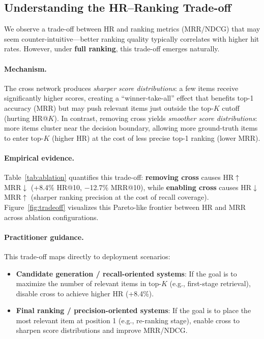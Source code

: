 \documentclass[sigconf,natbib=true]{acmart}
\begin{document}
\subsection{Understanding the HR--Ranking Trade-off}

We observe a trade-off between HR and ranking metrics (MRR/NDCG) that
may seem counter-intuitive---better ranking quality typically correlates
with higher hit rates. However, under \textbf{full ranking}, this
trade-off emerges naturally.

\paragraph{Mechanism.}
The cross network produces \emph{sharper score distributions}:
a few items receive significantly higher scores, creating a
``winner-take-all'' effect that benefits top-1 accuracy (MRR)
but may push relevant items just outside the top-$K$ cutoff (hurting HR@$K$).
In contrast, removing cross yields \emph{smoother score distributions}:
more items cluster near the decision boundary,
allowing more ground-truth items to enter top-$K$ (higher HR)
at the cost of less precise top-1 ranking (lower MRR).

\paragraph{Empirical evidence.}
Table~\ref{tab:ablation} quantifies this trade-off:
\textbf{removing cross} causes HR$\uparrow$ MRR$\downarrow$
(+8.4\% HR@10, $-$12.7\% MRR@10), while
\textbf{enabling cross} causes HR$\downarrow$ MRR$\uparrow$
(sharper ranking precision at the cost of recall coverage).
Figure~\ref{fig:tradeoff} visualizes this Pareto-like frontier
between HR and MRR across ablation configurations.

\paragraph{Practitioner guidance.}
This trade-off maps directly to deployment scenarios:
\begin{itemize}[leftmargin=*,itemsep=2pt]
  \item \textbf{Candidate generation / recall-oriented systems}:
    If the goal is to maximize the number of relevant items in top-$K$
    (e.g., first-stage retrieval), disable cross to achieve higher HR (+8.4\%).
  \item \textbf{Final ranking / precision-oriented systems}:
    If the goal is to place the most relevant item at position 1 (e.g., re-ranking stage),
    enable cross to sharpen score distributions and improve MRR/NDCG.
\end{itemize}
\end{document}
